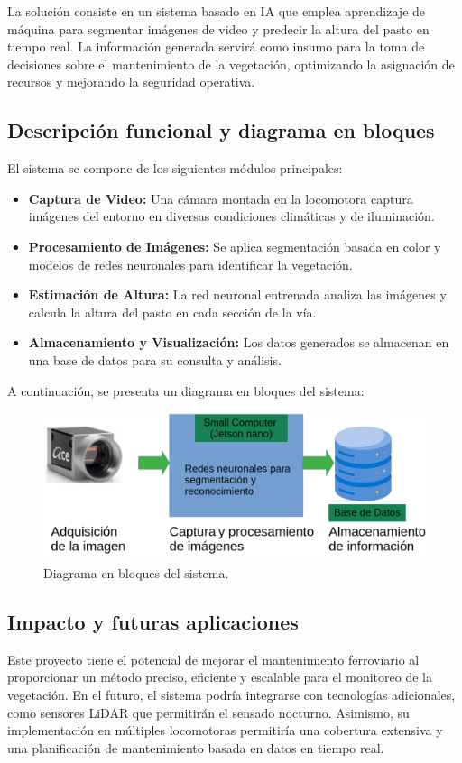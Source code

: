 \documentclass[
11pt, %
]{ProyectoVpC}
\begin{document}
La solución consiste en un sistema basado en IA que emplea aprendizaje de máquina para segmentar imágenes de video y predecir la altura del pasto en tiempo real. La información generada servirá como insumo para la toma de decisiones sobre el mantenimiento de la vegetación, optimizando la asignación de recursos y mejorando la seguridad operativa.

\subsection{Descripción funcional y diagrama en bloques}
El sistema se compone de los siguientes módulos principales:

\begin{itemize}
\item{\bf Captura de Video:} Una cámara montada en la locomotora captura imágenes del entorno en diversas condiciones climáticas y de iluminación.

\item{\bf Procesamiento de Imágenes:} Se aplica segmentación basada en color y modelos de redes neuronales para identificar la vegetación.

\item{\bf Estimación de Altura:} La red neuronal entrenada analiza las imágenes y calcula la altura del pasto en cada sección de la vía.

\item{\bf Almacenamiento y Visualización:} Los datos generados se almacenan en una base de datos para su consulta y análisis.
\end{itemize}
A continuación, se presenta un diagrama en bloques del sistema:

\begin{figure}[htpb]
\centering 
\includegraphics[width=.65\textwidth]{./Figuras/diagBloques.png}
\caption{Diagrama en bloques del sistema.}
\label{fig:diagBloques}
\end{figure}
\vspace{25px}

\subsection{Impacto y futuras aplicaciones}
Este proyecto tiene el potencial de mejorar el mantenimiento ferroviario al proporcionar un método preciso, eficiente y escalable para el monitoreo de la vegetación. En el futuro, el sistema podría integrarse con tecnologías adicionales, como sensores LiDAR que permitirán el sensado nocturno. Asimismo, su implementación en múltiples locomotoras permitiría una cobertura extensiva y una planificación de mantenimiento basada en datos en tiempo real.
\end{document}

